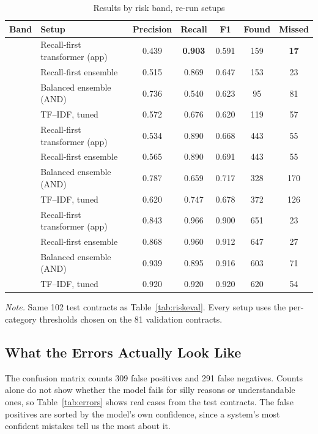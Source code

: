 \begin{table}[!htbp]
\centering
\caption{Results by risk band, re-run setups}
\label{tab:riskeval2}
\small
\begin{adjustbox}{max width=\textwidth}
\begin{tabular}{llccccc}
\toprule
\textbf{Band} & \textbf{Setup} & \textbf{Precision} & \textbf{Recall} & \textbf{F1} & \textbf{Found} & \textbf{Missed}\\
\midrule
{}
 & Recall-first transformer (app) & 0.439 & \textbf{0.903} & 0.591 & 159 & \textbf{17}\\
 & Recall-first ensemble & 0.515 & 0.869 & 0.647 & 153 & 23\\
 & Balanced ensemble (AND) & 0.736 & 0.540 & 0.623 & 95 & 81\\
 & TF--IDF, tuned & 0.572 & 0.676 & 0.620 & 119 & 57\\
\addlinespace
{}
 & Recall-first transformer (app) & 0.534 & 0.890 & 0.668 & 443 & 55\\
 & Recall-first ensemble & 0.565 & 0.890 & 0.691 & 443 & 55\\
 & Balanced ensemble (AND) & 0.787 & 0.659 & 0.717 & 328 & 170\\
 & TF--IDF, tuned & 0.620 & 0.747 & 0.678 & 372 & 126\\
\addlinespace
{}
 & Recall-first transformer (app) & 0.843 & 0.966 & 0.900 & 651 & 23\\
 & Recall-first ensemble & 0.868 & 0.960 & 0.912 & 647 & 27\\
 & Balanced ensemble (AND) & 0.939 & 0.895 & 0.916 & 603 & 71\\
 & TF--IDF, tuned & 0.920 & 0.920 & 0.920 & 620 & 54\\
\bottomrule
\end{tabular}
\end{adjustbox}

{\footnotesize\singlespacing \emph{Note.} Same 102 test contracts as Table~\ref{tab:riskeval}. Every setup uses the per-category thresholds chosen on the 81 validation contracts.\par}
\end{table}

\subsection{What the Errors Actually Look Like}
\label{sec:errorexamples}
The confusion matrix counts 309 false positives and 291 false negatives. Counts alone do not show whether the model fails for silly reasons or understandable ones, so Table~\ref{tab:errors} shows real cases from the test contracts. The false positives are sorted by the model's own confidence, since a system's most confident mistakes tell us the most about it.

